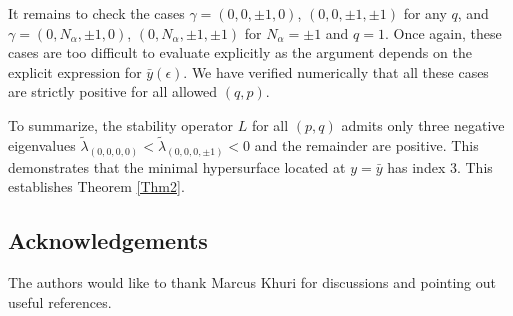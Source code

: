 \documentclass[11pt]{amsart}
\theoremstyle{plain}
\theoremstyle{definition}
\numberwithin{equation}{section}
\begin{document}
It remains to check the cases $\gamma = (0,0,\pm 1,0)$, $(0,0, \pm 1,\pm 1)$ for any $q$, and  $\gamma = (0,N_\alpha,\pm 1,0)$, $(0,N_\alpha,\pm 1,\pm 1)$ for $N_\alpha = \pm 1$ and $q=1$. Once again, these cases are too difficult to evaluate explicitly as the argument depends on the explicit expression for $\bar{y}(\epsilon)$. We have verified numerically that all these cases are strictly positive for all allowed $(q,p)$. 

To summarize, the stability operator $L$ for all $(p,q)$ admits only three negative eigenvalues $\tilde\lambda_{(0,0,0,0)} < \tilde\lambda_{(0,0,0,\pm 1)} < 0$ and the remainder are positive. This demonstrates that the minimal hypersurface located at $y = \bar{y}$ has index 3. This establishes Theorem \ref{Thm2}.

\subsection*{Acknowledgements} The authors would like to thank Marcus Khuri for discussions and pointing out useful references.  
\end{document}
